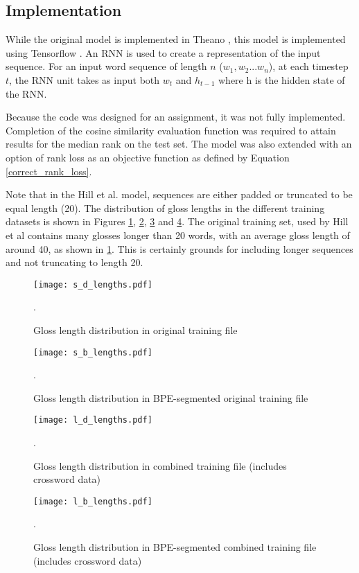 \documentclass[11pt]{article}
\begin{document}
\begin{spacing}{1}
\subsection{Implementation}
While the original model is implemented in Theano \cite{bergstra2010theano}, this model is implemented using Tensorflow \cite{abadi2016tensorflow}. An RNN is used to create a representation of the input sequence. For an input word sequence of length $n$ ($w_1, w_2 ... w_n$), at each timestep $t$, the RNN unit takes as input both $w_t$ and $h_{t-1}$ where h is the hidden state of the RNN. 

Because the code was designed for an assignment, it was not fully implemented. Completion of the cosine similarity evaluation function was required to attain results for the median rank on the test set. The model was also extended with an option of rank loss as an objective function as defined by Equation \ref{correct_rank_loss}.

Note that in the Hill et al. \citeyear{hill2015learning} model, sequences are either padded or truncated to be equal length (20). The distribution of gloss lengths in the different training datasets is shown in Figures \ref{s_d_lengths}, \ref{s_b_lengths}, \ref{l_d_lengths} and \ref{l_b_lengths}. The original training set, used by Hill et al \citeyear{hill2015learning} contains many glosses longer than 20 words, with an average gloss length of around 40, as shown in \ref{s_d_lengths}. This is certainly grounds for including longer sequences and not truncating to length 20.

\begin{figure}[!htpb]
\centering
\texttt{[image: s\_d\_lengths.pdf]}
\caption{Gloss length distribution in original training file}.
\label{s_d_lengths}
\end{figure}

\begin{figure}[!htpb]
\centering
\texttt{[image: s\_b\_lengths.pdf]}
\caption{Gloss length distribution in BPE-segmented original training file}.
\label{s_b_lengths}
\end{figure}

\begin{figure}[!htpb]
\centering
\texttt{[image: l\_d\_lengths.pdf]}
\caption{Gloss length distribution in combined training file (includes crossword data)}.
\label{l_d_lengths}
\end{figure}

\begin{figure}[!htpb]
\centering
\texttt{[image: l\_b\_lengths.pdf]}
\caption{Gloss length distribution in BPE-segmented combined training file (includes crossword data)}.
\label{l_b_lengths}
\end{figure}


\end{spacing}
\end{document}
